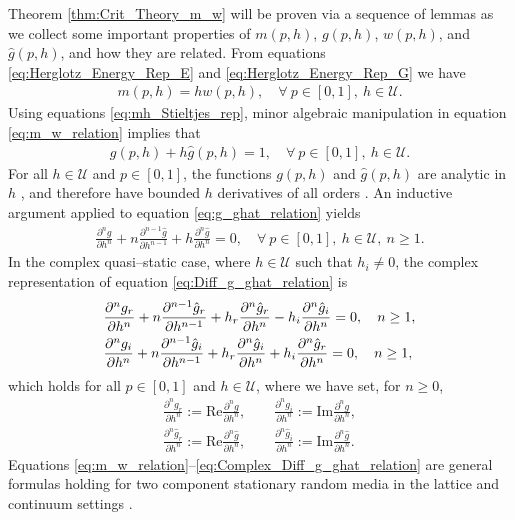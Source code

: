 \documentclass[english,12pt]{ttuthes}
\begin{document}
Theorem \ref{thm:Crit_Theory_m_w} will be proven via a sequence of
lemmas as we collect some important properties of $m(p,h)$, $g(p,h)$,
$w(p,h)$, and $\hat{g}(p,h)$, and how they are related. From equations
\eqref{eq:Herglotz_Energy_Rep_E} and \eqref{eq:Herglotz_Energy_Rep_G}
we have   
%
\begin{align}\label{eq:m_w_relation}
  m(p,h)=hw(p,h), \quad \forall \ p\in[0,1], \ h\in\mathcal{U}.
\end{align}
%
Using equations \eqref{eq:mh_Stieltjes_rep}, minor algebraic
manipulation in equation \eqref{eq:m_w_relation} implies that 
%
\begin{align}\label{eq:g_ghat_relation}
  g(p,h)+h\hat{g}(p,h)=1, \quad \forall \ p\in[0,1], \ h\in\mathcal{U}.
\end{align}
%
For all $h\in\mathcal{U}$ and $p\in[0,1]$, the functions $g(p,h)$ and
$\hat{g}(p,h)$ are analytic in $h$ \cite{Golden:CMP-473}, and
therefore have bounded $h$ derivatives of all orders
\cite{Rudin:87}. An inductive argument applied to equation
\eqref{eq:g_ghat_relation} yields  
%
\begin{align}\label{eq:Diff_g_ghat_relation}
  \frac{\partial^ng}{\partial h^n}+n\frac{\partial^{n-1}\hat{g}}{\partial h^{n-1}}+h\frac{\partial^n\hat{g}}{\partial h^n}=0,
  \quad \forall \ p\in[0,1], \ h\in\mathcal{U}, \ n\geq1.
\end{align}
%
In the complex quasi--static case, where $h\in\mathcal{U}$ such that
$h_i\neq0$, the complex representation of equation
\eqref{eq:Diff_g_ghat_relation} is        
%
\begin{align}\label{eq:Complex_Diff_g_ghat_relation}
  &\frac{\partial^ng_r}{\partial h^n}+n\frac{\partial^{n-1}\hat{g}_r}{\partial h^{n-1}}
  +h_r\frac{\partial^n\hat{g}_r}{\partial h^n}-h_i\frac{\partial^n\hat{g}_i}{\partial h^n}=0,
  \quad n\geq1, \\
%  
  &\frac{\partial^ng_i}{\partial h^n}+n\frac{\partial^{n-1}\hat{g}_i}{\partial h^{n-1}}
  +h_r\frac{\partial^n\hat{g}_i}{\partial h^n}+h_i\frac{\partial^n\hat{g}_r}{\partial h^n}=0,
  \quad n\geq1, \notag
\end{align}
%
which holds for all $p\in[0,1]$ and $h\in\mathcal{U}$, where we have set, for
$n\geq0$, 
%
\begin{align*}
  \frac{\partial^ng_r}{\partial h^n}:=\text{Re}\frac{\partial^ng}{\partial h^n}, \qquad
  \frac{\partial^ng_i}{\partial h^n}:=\text{Im}\frac{\partial^ng}{\partial h^n},
  \\
  \frac{\partial^n\hat{g}_r}{\partial h^n}:=\text{Re}\frac{\partial^n\hat{g}}{\partial h^n}, \qquad
  \frac{\partial^n\hat{g}_i}{\partial h^n}:=\text{Im}\frac{\partial^n\hat{g}}{\partial h^n}.
\end{align*}
Equations
\eqref{eq:m_w_relation}--\eqref{eq:Complex_Diff_g_ghat_relation} are
general formulas holding for two component stationary random media in
the lattice and continuum settings \cite{Golden:PRL-3935}.
\end{document}
